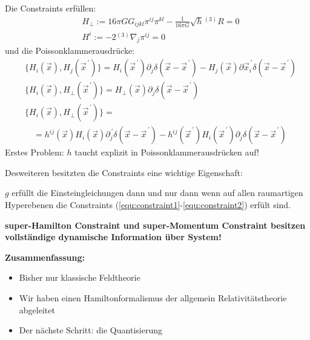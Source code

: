 \documentclass[mathserif]{beamer}
\newcommand{\inHS}{{}^{(3)}\!}
\theoremstyle{definition}
\begin{document}
	\begin{frame}
		Die Constraints erfüllen:
		\begin{align}
			&H_{\perp}:=16\pi G G_{ijkl}\pi^{ij}\pi^{kl}-\frac{1}{16\pi G}\sqrt{h}\inHS R=0 \label{equ:constraint1}\\
			&H^i:=-2\inHS\nabla_j\pi^{ij}=0 \label{equ:constraint2}
		\end{align}
		und die Poissonklammerausdrücke:
		\begin{align*}
			&\{H_i(\vec{x}),H_j(\vec{x}^{\,\prime})\}=H_i(\vec{x}^{\,\prime})\partial_j\delta(\vec{x}-\vec{x}^{\,\prime})-H_j(\vec{x})\partial\vec{x}^{\,\prime}_i\delta(\vec{x}-\vec{x}^{\,\prime})\\
			&\{H_i(\vec{x}),H_\perp(\vec{x}^{\,\prime})\}=H_\perp(\vec{x})\partial_j\delta(\vec{x}-\vec{x}^{\,\prime})\\
			&\{H_i(\vec{x}),H_\perp(\vec{x}^{\,\prime})\}=\\
			&\quad=h^{ij}(\vec{x})H_i(\vec{x})\partial^{\,\prime}_j\delta(\vec{x}-\vec{x}^{\,\prime})-h^{ij}(\vec{x}^{\,\prime})H_i(\vec{x}^{\,\prime})\partial_j\delta(\vec{x}-\vec{x}^{\,\prime})
		\end{align*}
		Erstes Problem: $h$ taucht explizit in Poissonklammerausdrücken auf!
	\end{frame}
	\begin{frame}
		Desweiteren besitzten die Constraints eine wichtige Eigenschaft:
		\begin{theorem}
			$g$ erfüllt die Einsteingleichungen dann und nur dann wenn auf allen raumartigen Hyperebenen
			die Constraints (\ref{equ:constraint1}-\ref{equ:constraint2}) erfült sind.
		\end{theorem}
		\pause
		\begin{center}
			\textbf{super-Hamilton Constraint und super-Momentum Constraint besitzen vollständige dynamische Information über System!}
		\end{center}
	\end{frame}
	\begin{frame}
		\begin{center}
			\textbf{Zusammenfassung:}
		\end{center}
		\begin{itemize}
			\item Bisher nur klassische Feldtheorie
			\pause
			\item Wir haben einen Hamiltonformalismus der allgemein Relativitätstheorie abgeleitet
			\pause
			\item Der nächste Schritt: die Quantisierung
		\end{itemize}
	\end{frame}
\end{document}
